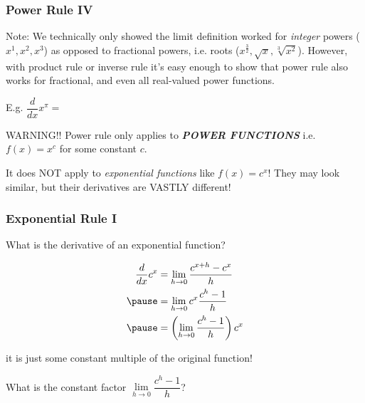 \documentclass{ltx-talk}
\begin{document}
\begin{frame}
  \frametitle{Power Rule IV}

  Note: We technically only showed the limit definition worked for \textit{integer} powers ($x^1, x^2, x^3$) \pause as opposed to fractional powers, i.e. roots ($x^{\frac{3}{2}}, \sqrt{x}, \sqrt[3]{x^2}$). \pause
  However, with product rule or inverse rule it's easy enough to show that power rule also works for fractional, and even all real-valued power functions. \pause

  E.g. $\dfrac{d}{dx}x^{\pi} = $ \pause

  \begin{alertblock}{WARNING!!}
    Power rule only applies to \textit{\textbf{POWER FUNCTIONS}} \pause
    i.e. $f(x) = x^c$ for some constant $c$.

    It does NOT apply to \textit{exponential functions} like $f(x) = c^x$!
    They may look similar, but their derivatives are VASTLY different!
  \end{alertblock}
\end{frame}

\begin{frame}
  \frametitle{Exponential Rule I}

  What is the derivative of an exponential function? \pause

  \begin{align}
    \dfrac{d}{dx} c^x &= \lim_{h \rightarrow 0} \dfrac{c^{x + h} - c^x}{h}  \\ \pause
                      &= \lim_{h \rightarrow 0} c^x \dfrac{c^h - 1}{h} \\ \pause
                      &= \left(\lim\limits_{h \rightarrow 0} \dfrac{c^h - 1}{h}\right) c^x
  \end{align} \pause

  it is just some constant multiple of the original function! \pause

  What is the constant factor $\lim\limits_{h \rightarrow 0} \dfrac{c^h - 1}{h}$?
\end{frame}
\end{document}
